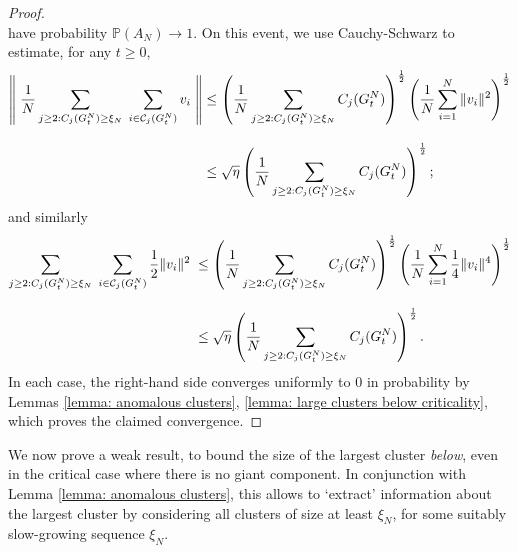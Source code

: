 \begin{proof}
\begin{equation}
    \end{equation} have probability $\mathbb{P}(A_N)\rightarrow 1$. On this event, we use Cauchy-Schwarz to estimate, for any $t\ge 0$, \begin{equation}\begin{split} \label{eq: use of CS 1}\left\|\hspace{0.1cm}\frac{1}{N}\sum_{j\geq 2: C_j(G^N_t)\geq \xi_N} \hspace{0.1cm}\sum_{i \in \mathcal{C}_j(G^N_t)} v_i \hspace{0.1cm}\right\| & \leq \left(\frac{1}{N}\sum_{j\geq 2: C_j(G^N_t)\geq \xi_N} C_j(G^N_t)\right)^\frac{1}{2}\left(\frac{1}{N}\sum_{i=1}^N \|v_i\|^2\right)^\frac{1}{2} \\[2ex] & \le  \sqrt{\eta}\left(\frac{1}{N}\sum_{j\geq 2: C_j(G^N_t)\geq \xi_N} C_j(G^N_t)\right)^\frac{1}{2}; \end{split} \end{equation} and similarly \begin{equation} \label{eq: use of CS 2} \begin{split} \sum_{j\geq 2: C_j(G^N_t)\geq \xi_N} \hspace{0.1cm}\sum_{i \in \mathcal{C}_j(G^N_t)} \frac{1}{2}\|v_i\|^2 \hspace{0.1cm} & \leq \left(\frac{1}{N}\sum_{j\geq 2: C_j(G^N_t)\geq \xi_N} C_j(G^N_t)\right)^\frac{1}{2}\left(\frac{1}{N}\sum_{i=1}^N \frac{1}{4}\|v_i\|^4\right)^\frac{1}{2} \\[2ex] & \leq \sqrt{\eta}\left(\frac{1}{N}\sum_{j\geq 2: C_j(G^N_t)\geq \xi_N} C_j(G^N_t)\right)^\frac{1}{2}. \end{split}\end{equation} In each case, the right-hand side converges uniformly to $0$ in probability by Lemmas \ref{lemma: anomalous clusters}, \ref{lemma: large clusters below criticality}, which proves the claimed convergence. \end{proof} 
We now prove a weak result, to bound the size of the largest cluster \emph{below}, even in the critical case where there is no giant component. In conjunction with Lemma \ref{lemma: anomalous clusters}, this allows to `extract' information about the largest cluster by considering all clusters of size at least $\xi_N$, for some suitably slow-growing sequence $\xi_N$.
